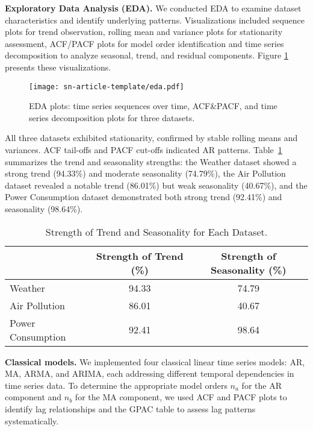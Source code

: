 \documentclass[sn-mathphys-num]{sn-jnl}
\theoremstyle{thmstyleone}%
\theoremstyle{thmstyletwo}%
\theoremstyle{thmstylethree}%
\begin{document}
\textbf{Exploratory Data Analysis (EDA).} We conducted EDA to examine dataset characteristics and identify underlying patterns. Visualizations included sequence plots for trend observation, rolling mean and variance plots for stationarity assessment, ACF/PACF plots for model order identification and time series decomposition to analyze seasonal, trend, and residual components. Figure \ref{fig:eda_plot} presents these visualizations.
\begin{figure}[]
	\begin{center}
		\texttt{[image: sn-article-template/eda.pdf]}
	\end{center}
	\caption{EDA plots: time series sequences over time, ACF\&PACF, and time series decomposition plots for three datasets.}
	\label{fig:eda_plot}
\end{figure}
All three datasets exhibited stationarity, confirmed by stable rolling means and variances. ACF tail-offs and PACF cut-offs indicated AR patterns. Table~\ref{tab:trend_seasonality} summarizes the trend and seasonality strengths: the Weather dataset showed a strong trend (94.33\%) and moderate seasonality (74.79\%), the Air Pollution dataset revealed a notable trend (86.01\%) but weak seasonality (40.67\%), and the Power Consumption dataset demonstrated both strong trend (92.41\%) and seasonality (98.64\%). 
\begin{table}[h]
\centering
\begin{tabular}{lcc}
\hline
\textbf{}        & \textbf{Strength of Trend (\%)} & \textbf{Strength of Seasonality (\%)} \\ \hline
Weather                 & 94.33                          & 74.79                                 \\ 
Air Pollution           & 86.01                          & 40.67                                 \\ 
Power Consumption       & 92.41                          & 98.64                                 \\ \hline
\end{tabular}
\caption{Strength of Trend and Seasonality for Each Dataset.}
\label{tab:trend_seasonality}
\end{table}

\textbf{Classical models.} We implemented four classical linear time series models: AR, MA, ARMA, and ARIMA, each addressing different temporal dependencies in time series data. To determine the appropriate model orders \(n_a\) for the AR component and \(n_b\) for the MA component, we used ACF and PACF plots to identify lag relationships and the GPAC table to assess lag patterns systematically. 
\end{document}
